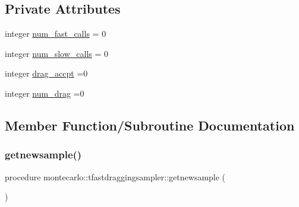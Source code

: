 \subsection*{Private Attributes}
\begin{DoxyCompactItemize}
\item 
integer \mbox{\hyperlink{structmontecarlo_1_1tfastdraggingsampler_a711a8dfc109e739fd198587d36cfdbc5}{num\+\_\+fast\+\_\+calls}} = 0
\item 
integer \mbox{\hyperlink{structmontecarlo_1_1tfastdraggingsampler_a8b923ef4ecd8c5258b53e7088a52756c}{num\+\_\+slow\+\_\+calls}} = 0
\item 
integer \mbox{\hyperlink{structmontecarlo_1_1tfastdraggingsampler_ac072142b2658d9a6f4c028c71d6653ee}{drag\+\_\+accpt}} =0
\item 
integer \mbox{\hyperlink{structmontecarlo_1_1tfastdraggingsampler_a297f76becf16072659c9789380c1aa1f}{num\+\_\+drag}} =0
\end{DoxyCompactItemize}


\subsection{Member Function/\+Subroutine Documentation}
\mbox{\label{structmontecarlo_1_1tfastdraggingsampler_af3a4edaea5bd7b6b4b2f1b472d9d1eec}} 
\subsubsection{\texorpdfstring{getnewsample()}{getnewsample()}}
{\footnotesize\ttfamily procedure montecarlo\+::tfastdraggingsampler\+::getnewsample (\begin{DoxyParamCaption}{ }\end{DoxyParamCaption})\hspace{0.3cm}{\ttfamily [private]}}

\mbox{\label{structmontecarlo_1_1tfastdraggingsampler_a75b2ef6b8f1e23e2162009f8808401f2}} 
